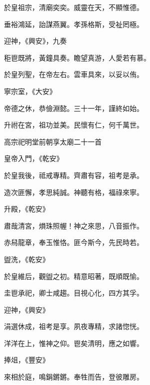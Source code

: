 \begin{pinyinscope}
 於皇祖宗，清廟奕奕。威靈在天，不顯惟德。



 垂裕鴻延，詒謀燕翼。孝孫格斯，受祉罔極。



 迎神，《興安》，九奏



 秬鬯既將，黃鐘具奏。瞻望真游，人愛若有慕。



 於皇列聖，在帝左右。雲車具來，以妥以侑。



 寧宗室，《大安》



 帝德之休，恭儉淵懿。三十一年，謹終如始。



 升祔在宮，祖功並美。民懷有仁，何千萬世。



 高宗祀明堂前朝享太廟二十一首



 皇帝入門，《乾安》



 於皇我後，祗戒專精。齊肅有容，祖考是承。



 造次匪懈，孝思純誠。神聽有格，福祿來寧。



 升殿，《乾安》



 肅哉清宮，熉珠照幄！神之來思，八音振作。



 赤舄龍章，奉玉惟恪。匪今斯今，先民時若。



 盥洗，《乾安》



 於皇維后，觀盥之初。精意昭著，既順既愉。



 圭鬯承祀，卿士咸趨。目視心化，四方其孚。



 迎神，《興安》



 涓選休成，祖考是享。夙夜專精，求諸惚恍。



 洋洋在上，惟神之仰。鬯矣清明，應之如響。



 捧俎，《豐安》



 來相於庭，鳴鋗鏘鏘。奉牲而告，登彼雕房。




\end{pinyinscope}

